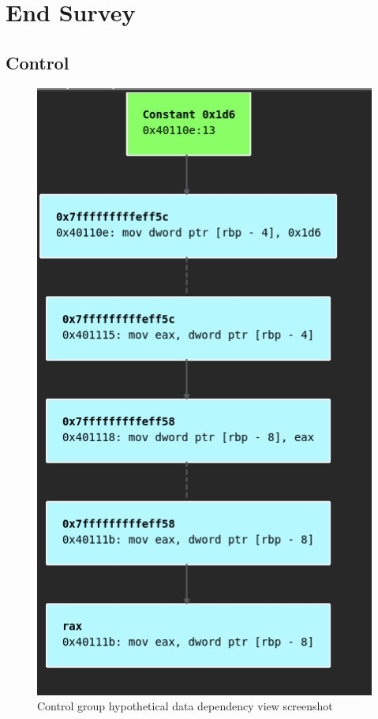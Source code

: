\section{End Survey}
\subsection{Control}
 \begin{figure}[!hb]
        \centering
        \includegraphics[scale=0.4]{images/surveyddg.png}
        \caption[Control Group Hypothetical Data Dependency View Screenshot]{Control group hypothetical data dependency view screenshot}
        \label{fig:surveyddg}
\end{figure}
